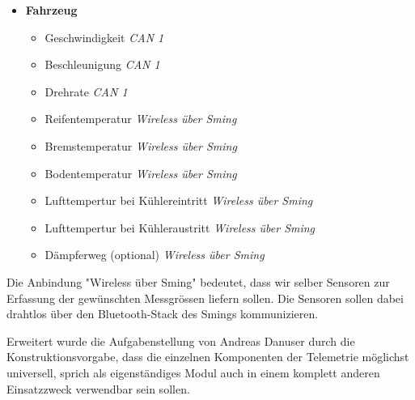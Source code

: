 \begin{itemize}
	\item \textbf{Fahrzeug}		
	\begin{itemize}
		\itemsep 1pt \parskip 0pt \parsep 0pt
		\item Geschwindigkeit						\textit{CAN 1}
		\item Beschleunigung						\textit{CAN 1}
		\item Drehrate 								\textit{CAN 1}
		\item Reifentemperatur						\textit{Wireless über Sming}
		\item Bremstemperatur						\textit{Wireless über Sming}
		\item Bodentemperatur						\textit{Wireless über Sming}
		\item Lufttempertur bei Kühlereintritt		\textit{Wireless über Sming}
		\item Lufttempertur bei Kühleraustritt		\textit{Wireless über Sming}
		\item Dämpferweg (optional)					\textit{Wireless über Sming}
		
	\end{itemize}			
\end{itemize}

Die Anbindung "Wireless über Sming" bedeutet, dass wir selber Sensoren zur Erfassung der gewünschten Messgrössen liefern sollen. Die Sensoren sollen dabei drahtlos über den Bluetooth-Stack des Smings kommunizieren.

Erweitert wurde die Aufgabenstellung von Andreas Danuser durch die Konstruktionsvorgabe, dass die einzelnen Komponenten der Telemetrie möglichst universell, sprich als eigenständiges Modul auch in einem komplett anderen Einsatzzweck verwendbar sein sollen.

